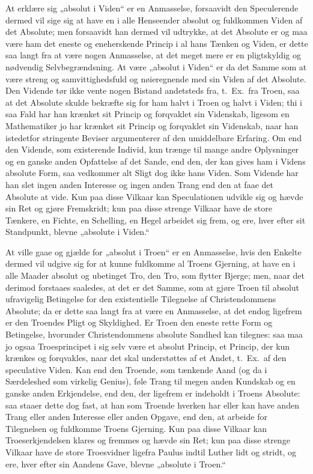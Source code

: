 At erklære sig „absolut i Viden“ er en Anmasselse, forsaavidt den
Speculerende dermed vil sige sig at have en i alle Henseender
absolut og fuldkommen Viden af det Absolute; men forsaavidt han
dermed vil udtrykke, at det Absolute er og maa være ham det eneste
og eneherskende Princip i al hans Tænken og Viden, er dette saa
langt fra at være nogen Anmasselse, at det meget mere er en
pligtskyldig og nødvendig Selvbegrændsning. At være „absolut i
Viden“ er da det Samme som at være streng og samvittighedsfuld og
nøieregnende med sin Viden af det Absolute. Den Vidende tør ikke
vente nogen Bistand andetsteds fra, t.\ Ex.\ fra Troen, saa at det
Absolute skulde bekræfte sig for ham halvt i Troen og halvt i
Viden; thi i saa Fald har han krænket sit Princip og forqvaklet
sin Videnskab, ligesom en Mathematiker jo har krænket sit Princip
og forqvaklet sin Videnskab, naar han istedetfor stringente
Beviser argumenterer af den umiddelbare Erfaring. Om end den
Vidende, som existerende Individ, kun trænge til mange andre
 Oplysninger og en ganske anden Opfattelse af det Sande, end den,
der kan gives ham i Videns absolute Form, saa vedkommer alt Sligt
dog ikke hans Viden. Som Vidende har han slet ingen anden
Interesse og ingen anden Trang end den at faae det Absolute at
vide. Kun paa disse Vilkaar kan Speculationen udvikle sig og hævde
sin Ret og gjøre Fremskridt; kun paa disse strenge Vilkaar have de
store Tænkere, en Fichte, en Schelling, en Hegel arbeidet sig
frem, og ere, hver efter sit Standpunkt, blevne „absolute i
Viden.“

At ville gaae og gjælde for „absolut i Troen“ er en Anmasselse,
hvis den Enkelte dermed vil udgive sig for at kunne fuldkomme al
Troens Gjerning, at have en i alle Maader absolut og ubetinget
Tro, den Tro, som flytter Bjerge; men, naar det derimod forstaaes
saaledes, at det er det Samme, som at gjøre Troen til absolut
ufravigelig Betingelse for den existentielle Tilegnelse af
Christendommens Absolute; da er dette saa langt fra at være en
Anmasselse, at det endog ligefrem er den Troendes Pligt og
Skyldighed. Er Troen den eneste rette Form og Betingelse,
hvorunder Christendommens absolute Sandhed kan tilegnes: saa maa
jo ogsaa Troesprincipet i sig selv være et absolut Princip, et
Princip, der kun krænkes og forqvakles, naar det skal
understøttes af et Andet, t.\ Ex.\ af den speculative Viden. Kan
end den Troende, som tænkende Aand (og da i Særdeleshed som
virkelig Genius), føle Trang til megen anden Kundskab og en ganske
anden Erkjendelse,
 end den, der ligefrem er indeholdt i Troens Absolute: saa staaer
dette dog fast, at han som Troende hverken har eller kan have
anden Trang eller anden Interesse eller anden Opgave, end den, at
arbeide for Tilegnelsen og fuldkomme Troens Gjerning. Kun paa
disse Vilkaar kan Troeserkjendelsen klares og fremmes og hævde sin
Ret; kun paa disse strenge Vilkaar have de store Troesvidner
ligefra Paulus indtil Luther lidt og stridt, og ere, hver efter
sin Aandens Gave, blevne „absolute i Troen.“

